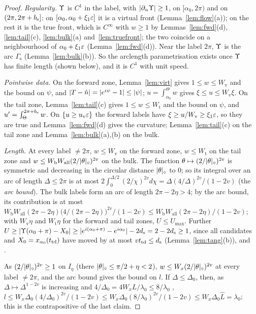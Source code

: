 \begin{proof}
\emph{Regularity.} $\Upsilon$ is $C^1$ in the label, with $|\partial_\alpha\Upsilon|\ge1$, on $[\alpha_0,2\pi)$ and on $(2\pi,2\pi+b_{\mathrm e}]$: on
$[\alpha_0,\alpha_0+\xi_1\varepsilon]$ it is a virtual front (Lemma~\ref{lem:flow}(a)); on the rest it is the true front, which is $C^\infty$
with $w\ge1$ by Lemmas~\ref{lem:fwd}(d), \ref{lem:tail}(c), \ref{lem:bulk}(a) and~\ref{lem:truefront}; the two coincide on a
neighbourhood of $\alpha_0+\xi_1\varepsilon$ (Lemma~\ref{lem:fwd}(d)). Near the label $2\pi$, $\Upsilon$ is the arc $\Gamma_{\mathrm s}$
(Lemma~\ref{lem:bulk}(b)). So the arclength parametrisation exists once $\Upsilon$ has finite length (shown below), and it is $C^1$ with
unit speed.

\emph{Pointwise data.} On the forward zone, Lemma~\ref{lem:virt} gives $1\le w\le W_{\mathrm v}$ and the bound on $\psi$, and
$|T-\hat n|=|e^{i\psi}-1|\le|\psi|$; $u=\int_{\alpha_0}^{\Theta}w$ gives $\xi\le u\le W_{\mathrm v}\xi$. On the tail zone,
Lemma~\ref{lem:tail}(c) gives $1\le w\le W_{\mathrm t}$ and the bound on $\psi$, and $u'=\int_\Theta^{2\pi+b_{\mathrm e}}w$. On
$\{u\ge u_{\mathrm v}\varepsilon\}$ the forward labels have $\xi\ge u/W_{\mathrm v}\ge\xi_1\varepsilon$, so they are true and Lemma~\ref{lem:fwd}(d)
gives the curvature; Lemma~\ref{lem:tail}(c) on the tail zone and Lemma~\ref{lem:bulk}(a),(b) on the bulk.

\emph{Length.} At every label $\ne2\pi$, $w\le W_{\mathrm v}$ on the forward zone, $w\le W_{\mathrm t}$ on the tail zone and
$w\le W_{\mathrm b}W_{\mathrm{all}}(2/|\theta|_\circ)^{2v}$ on the bulk. The function $\theta\mapsto(2/|\theta|_\circ)^{2v}$ is
symmetric and decreasing in the circular distance $|\theta|_\circ$ to $0$; so its integral over an arc of length $\Delta\le2\pi$ is at
most $2\int_0^{\Delta/2}(2/\chi)^{2v}d\chi=\Delta(4/\Delta)^{2v}/(1-2v)$ (the \emph{arc bound}). The bulk labels form an arc of length
$2\pi-2\eta>4$; by the arc bound, its contribution is at most
$W_{\mathrm b}W_{\mathrm{all}}(2\pi-2\eta)\bigl(4/(2\pi-2\eta)\bigr)^{2v}/(1-2v)\le W_{\mathrm b}W_{\mathrm{all}}(2\pi-2\eta)/(1-2v)$; with
$W_{\mathrm v}\eta$ and $W_{\mathrm t}\eta$ for the forward and tail zones, $U\le U_{\max}$. Further
$U\ge|\Upsilon(\alpha_0+\pi)-X_0|\ge|e^{i(\alpha_0+\pi)}-e^{i\alpha_0}|-2d_{\mathrm s}=2-2d_{\mathrm s}\ge1$, since all candidates and
$X_0=x_{\alpha_0}(t_{\mathrm{td}})$ have moved by at most $vt_{\mathrm{td}}\le d_{\mathrm s}$ (Lemma~\ref{lem:tang}(b)), and .

As $(2/|\theta|_\circ)^{2v}\ge1$ on $I_\eta$ (there $|\theta|_\circ\le\pi/2+\eta<2$), $w\le W_x(2/|\theta|_\circ)^{2v}$ at every label
$\ne2\pi$, and the arc bound gives the bound on $l$. If
$\Delta\le\Delta_0$, then, as $\Delta\mapsto\Delta^{1-2v}$ is increasing and $4/\Delta_0=4W_x\hat L/\lambda_0\le8/\lambda_0$ ,
$l\le W_x\Delta_0(4/\Delta_0)^{2v}/(1-2v)\le W_x\Delta_0(8/\lambda_0)^{2v}/(1-2v)\le W_x\Delta_0\hat L=\lambda_0$; this is the contrapositive
of the last claim.
\end{proof}

